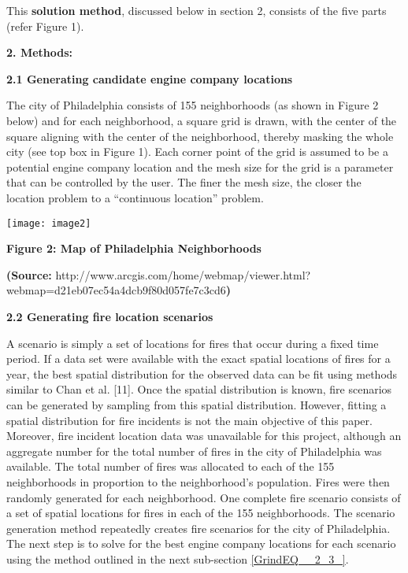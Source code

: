 \documentclass{article} %
\begin{document}
\noindent 

\noindent This \textbf{solution method}, discussed below in section 2, consists of the five parts (refer Figure 1).

\noindent 

\noindent \textbf{2. Methods:}

\noindent \textbf{2.1 Generating candidate engine company locations}

\noindent The city of Philadelphia consists of 155 neighborhoods (as shown in Figure 2 below) and for each neighborhood, a square grid is drawn, with the center of the square aligning with the center of the neighborhood, thereby masking the whole city (see top box in Figure 1).    Each corner point of the grid is assumed to be a potential engine company location and the mesh size for the grid is a parameter that can be controlled by the user.  The finer the mesh size, the closer the location problem to a ``continuous location'' problem.

\noindent 

\noindent \texttt{[image: image2]}

\noindent \textbf{Figure 2: Map of Philadelphia Neighborhoods}

\noindent \textbf{(Source: }http://www.arcgis.com/home/webmap/viewer.html?webmap=d21eb07ec54a4dcb9f80d057fe7c3cd6\textbf{)}

\noindent 

\noindent \textbf{2.2 Generating fire location scenarios}

\noindent A scenario is simply a set of locations for fires that occur during a fixed time period.  If a data set were available with the exact spatial locations of fires for a year, the best spatial distribution for the observed data can be fit using methods similar to Chan et al. [11].  Once the spatial distribution is known, fire scenarios can be generated by sampling from this spatial distribution.  However, fitting a spatial distribution for fire incidents is not the main objective of this paper.   Moreover, fire incident location data was unavailable for this project, although an aggregate number for the total number of fires in the city of Philadelphia was available.  The total number of fires was allocated to each of the 155 neighborhoods in proportion to the neighborhood's population.   Fires were then randomly generated for each neighborhood.  One complete fire scenario consists of a set of spatial locations for fires in each of the 155 neighborhoods.  The scenario generation method repeatedly creates fire scenarios for the city of Philadelphia.  The next step is to solve for the best engine company locations for each scenario using the method outlined in the next sub-section \eqref{GrindEQ__2_3_}.
\end{document}
